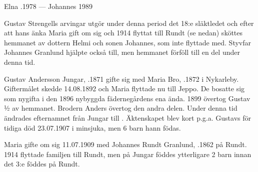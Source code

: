 Elna .1978  ---  Johannes  1989


Gustav Strengells arvingar utgör under denna period det 18:e släktledet och efter att hans änka Maria gift om sig och 1914 flyttat till Rundt (se nedan) sköttes hemmanet av dottern Helmi och sonen Johannes, som inte flyttade med. Styvfar Johannes Granlund hjälpte också till, men hemmanet förföll till en del under denna tid.


Gustav Andersson Jungar, .1871 gifte sig med Maria Bro, .1872 i Nykarleby. Giftermålet skedde 14.08.1892 och Maria flyttade nu till Jeppo. De bosatte sig som nygifta i den 1896 nybyggda fädernegårdens ena ända. 1899 övertog Gustav ½ av hemmanet. Brodern Anders övertog den andra delen. Under denna tid ändrades efternamnet från Jungar till . Äktenskapet blev kort p.g.a. Gustavs för tidiga död 23.07.1907 i minsjuka, men 6 barn hann födas.
\begin{jhchildren}
  \item {}
  \item {}
  \item {}
  \item {}
  \item {}
  \item {}
\end{jhchildren}

Maria gifte om sig 11.07.1909 med Johannes Rundt Granlund, .1862 på Rundt. 1914 flyttade familjen till Rundt, men på Jungar föddes ytterligare 2 barn innan det 3:e föddes på Rundt.
\begin{jhchildren}
  \item {}
  \item {}
  \item {}
\end{jhchildren}

